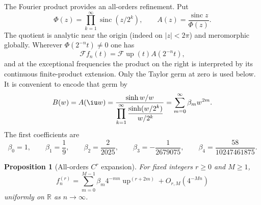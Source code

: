 \documentclass[11pt,oneside]{article}
\newtheorem{proposition}[theorem]{Proposition}
\theoremstyle{definition}
\theoremstyle{remark}
\newcommand{\R}{\mathbb R}
\newcommand{\Up}{\operatorname{up}}
\newcommand{\sinc}{\operatorname{sinc}}
\begin{document}
The Fourier product provides an all-orders refinement.  Put
\begin{equation}
 \Phi(z)=\prod_{k=1}^{\infty}\sinc(z/2^k),
 \qquad
 A(z)=\frac{\sinc z}{\Phi(z)}.
 \label{repeated2:eq:A-ratio}
\end{equation}
The quotient is analytic near the origin (indeed on $|z|<2\pi$) and meromorphic
globally.  Wherever $\Phi(2^{-n}t)\ne0$ one has
\begin{equation}
 \mathscr F f_n(t)=\mathscr F\Up(t)A(2^{-n}t),
 \label{repeated2:eq:fourier-ratio}
\end{equation}
and at the exceptional frequencies the product on the right is interpreted by its
continuous finite-product extension.  Only the Taylor germ at zero is used below.  It is
convenient to encode that germ by
\begin{equation}
 B(w)=A(\iu w)
 =\frac{\sinh w/w}{\displaystyle\prod_{k=1}^{\infty}
 \frac{\sinh(w/2^k)}{w/2^k}}
 =\sum_{m=0}^{\infty}\beta_mw^{2m}.
 \label{repeated2:eq:B-generating}
\end{equation}
The first coefficients are
\begin{equation}
 \beta_0=1,
 \qquad \beta_1=\frac19,
 \qquad \beta_2=\frac{2}{2025},
 \qquad \beta_3=-\frac1{2679075},
 \qquad \beta_4=\frac{58}{10247461875}.
 \label{repeated2:eq:beta-first}
\end{equation}

\begin{proposition}[All-orders $C^r$ expansion]
\label{repeated2:prop:all-orders-expansion}
For fixed integers $r\ge0$ and $M\ge1$,
\begin{equation}
 f_n^{(r)}
 =\sum_{m=0}^{M-1}\beta_m4^{-mn}\Up^{(r+2m)}
 +O_{r,M}(4^{-Mn})
 \label{repeated2:eq:all-orders-expansion}
\end{equation}
uniformly on $\R$ as $n\to\infty$.
\end{proposition}
\end{document}
